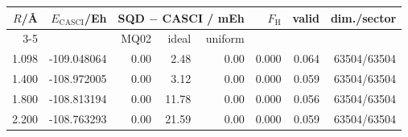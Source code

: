 \begin{tabular}{rrrrrrrr}
\toprule
$R$/\AA & $E_\mathrm{CASCI}$/Eh & \multicolumn{3}{c}{SQD $-$ CASCI / mEh} & $F_\mathrm{H}$ & valid & dim./sector \\
\cmidrule(lr){3-5}
 & & MQ02 & ideal & uniform & & & \\
\midrule
1.098 & -109.048064 & 0.00 & 2.48 & 0.00 & 0.000 & 0.064 & 63504/63504 \\
1.400 & -108.972005 & 0.00 & 3.12 & 0.00 & 0.000 & 0.059 & 63504/63504 \\
1.800 & -108.813194 & 0.00 & 11.78 & 0.00 & 0.000 & 0.056 & 63504/63504 \\
2.200 & -108.763293 & 0.00 & 21.59 & 0.00 & 0.000 & 0.059 & 63504/63504 \\
\bottomrule
\end{tabular}

